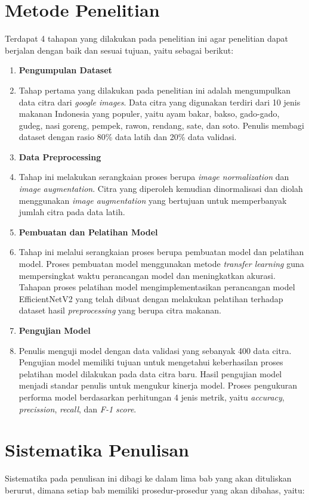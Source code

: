 \section{Metode Penelitian}
Terdapat 4 tahapan yang dilakukan pada penelitian ini agar penelitian dapat berjalan dengan baik dan sesuai tujuan, yaitu sebagai berikut:
\begin{enumerate}
    \item \textbf{Pengumpulan Dataset}
    \item[] Tahap pertama yang dilakukan pada penelitian ini adalah mengumpulkan data citra dari \textit{google images}. Data citra yang digunakan terdiri dari 10 jenis makanan Indonesia yang populer, yaitu ayam bakar, bakso, gado-gado, gudeg, nasi goreng, pempek, rawon, rendang, sate, dan soto. Penulis membagi dataset dengan rasio 80\% data latih dan 20\% data validasi.
    \item \textbf{Data Preprocessing}
    \item[] Tahap ini melakukan serangkaian proses berupa \textit{image normalization} dan \textit{image augmentation}. Citra yang diperoleh kemudian dinormalisasi dan diolah menggunakan \textit{image augmentation} yang bertujuan untuk memperbanyak jumlah citra pada data latih.
    \item \textbf{Pembuatan dan Pelatihan Model}
    \item[] Tahap ini melalui serangkaian proses berupa pembuatan model dan pelatihan model. Proses pembuatan model menggunakan metode \textit{transfer learning} guna mempersingkat waktu perancangan model dan meningkatkan akurasi. Tahapan proses pelatihan model mengimplementasikan perancangan model EfficientNetV2 yang telah dibuat dengan melakukan pelatihan terhadap dataset hasil \textit{preprocessing} yang berupa citra makanan.
    \item \textbf{Pengujian Model}
    \item[] Penulis menguji model dengan data validasi yang sebanyak 400 data citra. Pengujian model memiliki tujuan untuk mengetahui keberhasilan proses pelatihan model dilakukan pada data citra baru. Hasil pengujian model menjadi standar penulis untuk mengukur kinerja model. Proses pengukuran performa model berdasarkan perhitungan 4 jenis metrik, yaitu \textit{accuracy}, \textit{precission}, \textit{recall}, dan \textit{F-1 score}.
\end{enumerate}

\section{Sistematika Penulisan}
Sistematika pada penulisan ini dibagi ke dalam lima bab yang akan dituliskan berurut, dimana setiap bab memiliki prosedur-prosedur yang akan dibahas, yaitu:

